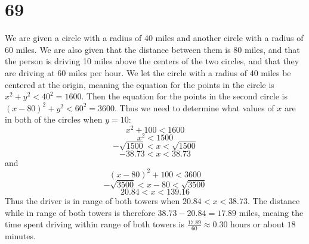 \documentclass{article}
\theoremstyle{definition}
\newcommand{\?}{\stackrel{?}{=}}
\begin{document}
\section*{69}
We are given a circle with a radius of 40 miles and another circle with a radius of 60 miles. We are also given that the distance between them is 80 miles, and that 
the person is driving 10 miles above the centers of the two circles, and that they are driving at 60 miles per hour. We let the circle with a radius of 40 miles be centered 
at the origin, meaning the equation for the points in the circle is $x^2+y^2<40^2=1600$. Then the equation for the points in the second circle is $(x-80)^2+y^2<60^2=3600$. 
Thus we need to determine what values of $x$ are in both of the circles when $y=10$: 
\[ x^2+100<1600 \] \[ x^2<1500 \] \[ -\sqrt{1500}<x<\sqrt{1500} \] \[ -38.73<x<38.73 \] and \[ (x-80)^2+100<3600 \] \[ -\sqrt{3500}<x-80<\sqrt{3500} \]
\[ 20.84<x<139.16 \] Thus the driver is in range of both towers when $20.84<x<38.73$. The distance while in range of both towers is therefore $38.73-20.84=17.89$ miles, 
meaing the time spent driving within range of both towers is $\frac{17.89}{60}\approx 0.30$ hours or about $18$ minutes.
\end{document}
